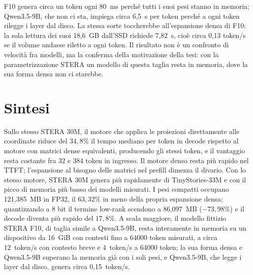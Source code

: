F10 genera circa un token ogni 80~ms perché tutti i suoi pesi stanno in memoria; Qwen3.5-9B, che non ci sta, impiega circa 6,5~s per token perché a ogni token rilegge i layer dal disco. La stessa sorte toccherebbe all'espansione densa di F10: la sola lettura dei suoi 18,6~GB dall'SSD richiede 7,82~s, cioè circa 0,13 token/s se il volume andasse riletto a ogni token. Il risultato non è un confronto di velocità fra modelli, ma la conferma della motivazione della tesi: con la parametrizzazione STERA un modello di questa taglia resta in memoria, dove la sua forma densa non ci starebbe.

\section{Sintesi}

Sullo stesso STERA 30M, il motore che applica le proiezioni direttamente alle coordinate riduce del $34{,}8\%$ il tempo mediano per token in decode rispetto al motore con matrici dense equivalenti, producendo gli stessi token, e il vantaggio resta costante fra 32 e 384 token in ingresso. Il motore denso resta più rapido nel TTFT; l'espansione al bisogno delle matrici nel prefill dimezza il divario. Con lo stesso motore, STERA 30M genera più rapidamente di TinyStories-33M e con il picco di memoria più basso dei modelli misurati. I pesi compatti occupano 121,385~MB in FP32, il $63{,}32\%$ in meno della propria espansione densa; quantizzando a 8 bit il termine low-rank scendono a 86,097~MB ($-73{,}98\%$) e il decode diventa più rapido del $17{,}8\%$. A scala maggiore, il modello fittizio STERA F10, di taglia simile a Qwen3.5-9B, resta interamente in memoria su un dispositivo da 16~GiB con contesti fino a \num{64000} token misurati, a circa 12~token/s con contesto breve e 4~token/s a \num{64000} token; la sua forma densa e Qwen3.5-9B superano la memoria già con i soli pesi, e Qwen3.5-9B, che legge i layer dal disco, genera circa 0,15~token/s.
